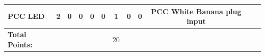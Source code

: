 \begin{table}[!htp]
{\begin{tabular}{lcccccccccll}
			PCC LED                    & 2                       & 0                                           & 0                                          & 0           & 0           & 1            & 0                & 0 & PCC White Banana plug input  &                                  &                \\ \midrule
			\textbf{Total Points:}     &                         &                                             &                                            &             &             & 20           &                  &   &                              &                                  &                \\ \bottomrule
		\end{tabular}
	}
\end{table}
